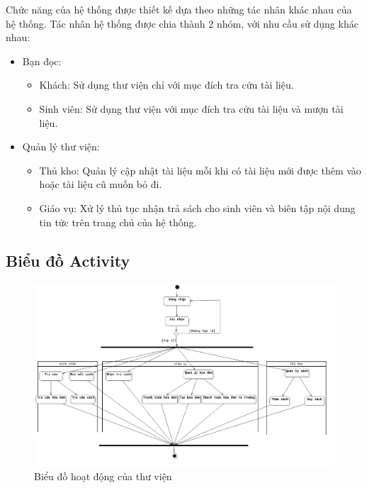 \documentclass[../report.tex]{subfiles}
\begin{document}
Chức năng của hệ thống được thiết kế dựa theo những tác nhân khác nhau của hệ thống. 
Tác nhân hệ thống được chia thành 2 nhóm, với nhu cầu sử dụng khác nhau: 
\begin{itemize}
    \item Bạn đọc:
        \begin{itemize}
            \item Khách: Sử dụng thư viện chỉ với mục đích tra cứu tài liệu. 
            \item Sinh viên: Sử dụng thư viện với mục đích tra cứu tài liệu và mượn tài liệu. 
        \end{itemize}
    \item Quản lý thư viện: 
        \begin{itemize}
            \item Thủ kho: Quản lý cập nhật tài liệu mỗi khi có tài liệu mới được thêm vào hoặc tài liệu cũ muốn bỏ đi. 
            \item Giáo vụ: Xử lý thủ tục nhận trả sách cho sinh viên và biên tập nội dung tin tức trên trang chủ của hệ thống. 
        \end{itemize}
\end{itemize}

\subsection{Biểu đồ Activity}
\begin{figure}[H]
\centering
\includegraphics[width=\textwidth]{figures/active.png}
\caption{Biểu đồ hoạt động của thư viện}
\end{figure}
\end{document}
